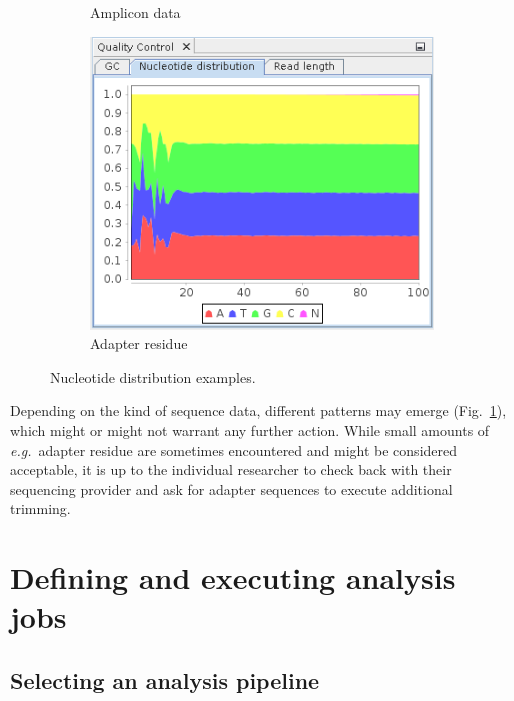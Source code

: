 \begin{figure}[H]
\begin{subfigure}[b]{0.3\textwidth}
                \caption{Amplicon data}
        \end{subfigure}
        \begin{subfigure}[b]{0.3\textwidth}
                \includegraphics[width=\textwidth]{img/mgx/adapterNucl}
                \caption{Adapter residue}
        \end{subfigure}
        \caption{Nucleotide distribution examples.}
  \label{qc4}
\end{figure}

Depending on the kind of sequence data, different patterns may emerge (Fig.~\ref{qc4}),
which might or might not warrant any further action. While small amounts of \textit{e.g.}~adapter
residue are sometimes encountered and might be considered acceptable, it is up to the
individual researcher to check back with their sequencing provider and ask for
adapter sequences to execute additional trimming.

\section{Defining and executing analysis jobs}

\subsection{Selecting an analysis pipeline}

